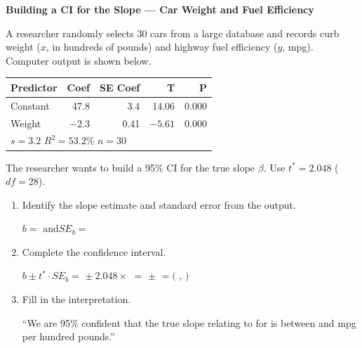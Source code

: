 \documentclass[10pt]{article}
\begin{document}
\namepartnerperiod

\vspace{0.1in}
\textbf{Building a CI for the Slope --- Car Weight and Fuel Efficiency}

\vspace{0.05in}
A researcher randomly selects 30 cars from a large database and records curb weight
($x$, in hundreds of pounds) and highway fuel efficiency ($y$, mpg).
Computer output is shown below.

\vspace{0.1in}
\begin{center}
\renewcommand{\arraystretch}{1.3}
\begin{tabular}{lrrrr}
    \textbf{Predictor} & \textbf{Coef} & \textbf{SE Coef} & \textbf{T} & \textbf{P} \\
    \hline
    Constant & 47.8 & 3.4 & 14.06 & 0.000 \\
    Weight   & $-2.3$ & 0.41 & $-5.61$ & 0.000 \\
    \hline
    \multicolumn{5}{l}{$s = 3.2$ \quad $R^2 = 53.2\%$ \quad $n = 30$}
\end{tabular}
\end{center}

\vspace{0.05in}
The researcher wants to build a 95\% CI for the true slope $\beta$.
Use $t^* = 2.048$ ($df = 28$).

\vspace{0.1in}

\begin{tcolorbox}[colback=white, colframe=black!40,
    title=\textbf{Tier R --- Remediate},
    fonttitle=\bfseries, arc=2mm, left=3mm, right=3mm, top=2mm, bottom=2mm]

\begin{enumerate}[label=\alph*.]

    \item Identify the slope estimate and standard error from the output.

          $b = $ \blank{2.5cm}\quad and\quad $SE_b = $ \blank{2.5cm}

    \item Complete the confidence interval.

          $b \pm t^* \cdot SE_b
          = $ \blank{2cm} $\pm\ 2.048 \times $ \blank{2cm}
          $= $ \blank{2cm} $\pm$ \blank{2cm}
          $= ($ \blank{2.5cm},\; \blank{2.5cm}$)$

    \item Fill in the interpretation.

          ``We are 95\% confident that the true slope relating
          \blank{3.5cm} to \blank{3.5cm}
          for \blank{3.5cm}
          is between \blank{2cm} and \blank{2cm}
          mpg per hundred pounds.''

\end{enumerate}
\end{tcolorbox}
\end{document}

